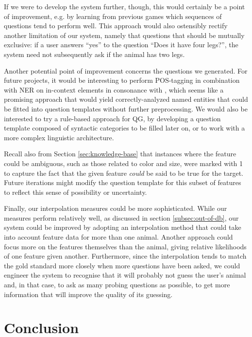 \documentclass[11pt,a4paper]{article}
\begin{document}
If we were to develop the system further, though, this would certainly be a point of improvement, e.g. by learning from previous games which sequences of questions tend to perform well. This approach would also ostensibly rectify another limitation of our system, namely that questions that should be mutually exclusive: if a user answers ``yes'' to the question ``Does it have four legs?'', the system need not subsequently ask if the animal has two legs. 

Another potential point of improvement concerns the questions we generated.
For future projects, it would be interesting to perform POS-tagging in combination with NER on in-context elements in consonance with \citet{Mandasari2019}, which seems like a promising approach that would yield correctly-analyzed named entities that could be fitted into question templates without further preprocessing. 
We would also be interested to try a rule-based approach for QG, by developing a question template composed of syntactic categories to be filled later on, or to work with a more complex linguistic architecture. 

Recall also from Section \ref{sec:knowledge-base} that instances where the feature could be ambiguous, such as those related to color and size, were marked with 1 to capture the fact that the given feature \textit{could} be said to be true for the target.
Future iterations might modify the question template for this subset of features to reflect this sense of possibility or uncertainty.

Finally, our interpolation measures could be more sophisticated. While our measures perform relatively well, as discussed in section \ref{subsec:out-of-db}, our system could be improved by adopting an interpolation method that could take into account feature data for more than one animal. 
Another approach could focus more on the features themselves than the animal, giving relative likelihoods of one feature given another.
Furthermore, since the interpolation tends to match the gold standard more closely when more questions have been asked, we could engineer the system to recognise that it will probably not guess the user's animal and, in that case, to ask as many probing questions as possible, to get more information that will improve the quality of its guessing.

\section{Conclusion}
\label{sec:concl}
\end{document}
